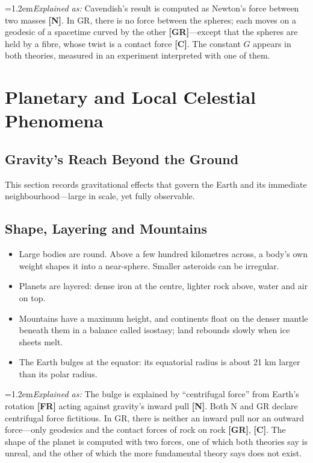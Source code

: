 \documentclass[11pt,a4paper]{article}
\newcommand{\reg}[1]{\textsf{\small\textbf{[#1]}}}
\newcommand{\RN}{\reg{N}}
\newcommand{\RGR}{\reg{GR}}
\newcommand{\RFR}{\reg{FR}}
\newcommand{\RC}{\reg{C}}
\newcommand{\expl}[1]{\par\begingroup\leftskip=1.2em\small\noindent\textit{Explained as:} #1\par\endgroup\smallskip}%
\begin{document}
\expl{Cavendish's result is computed as Newton's force between two masses \RN{}. In GR, there is no force between the spheres; each moves on a geodesic of a spacetime curved by the other \RGR{}---except that the spheres are held by a fibre, whose twist is a contact force \RC{}. The constant $G$ appears in both theories, measured in an experiment interpreted with one of them.}

\section{Planetary and Local Celestial Phenomena}

\subsection{Gravity's Reach Beyond the Ground}

This section records gravitational effects that govern the Earth and its immediate neighbourhood---large in scale, yet fully observable.

\subsection{Shape, Layering and Mountains}

\begin{itemize}
  \item Large bodies are round. Above a few hundred kilometres across, a body's own weight shapes it into a near-sphere. Smaller asteroids can be irregular.
  \item Planets are layered: dense iron at the centre, lighter rock above, water and air on top.
  \item Mountains have a maximum height, and continents float on the denser mantle beneath them in a balance called isostasy; land rebounds slowly when ice sheets melt.
  \item The Earth bulges at the equator: its equatorial radius is about 21 km larger than its polar radius.
\end{itemize}

\expl{The bulge is explained by ``centrifugal force'' from Earth's rotation \RFR{} acting against gravity's inward pull \RN{}. Both N and GR declare centrifugal force fictitious. In GR, there is neither an inward pull nor an outward force---only geodesics and the contact forces of rock on rock \RGR{}, \RC{}. The shape of the planet is computed with two forces, one of which both theories say is unreal, and the other of which the more fundamental theory says does not exist.}
\end{document}
